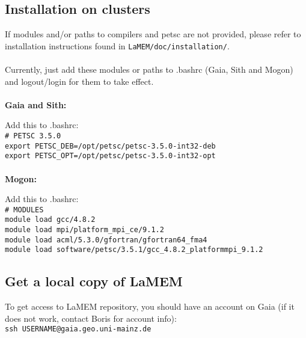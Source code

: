 \documentclass[a4paper,11pt]{article}
\begin{document}
\subsection{Installation on clusters}

If modules and/or paths to compilers and petsc are not provided, please refer to installation instructions found in \texttt{LaMEM/doc/installation/}.\\
\\
Currently, just add these modules or paths to .bashrc (Gaia, Sith and Mogon) and logout/login for them to take effect.\\
\\
\textbf{Gaia and Sith:}

Add this to .bashrc:\\
\indent \texttt{\# PETSC 3.5.0}\\
\indent \texttt{export PETSC\_DEB=/opt/petsc/petsc-3.5.0-int32-deb}\\
\indent \texttt{export PETSC\_OPT=/opt/petsc/petsc-3.5.0-int32-opt}\\
\\
\textbf{Mogon:}

Add this to .bashrc:\\
\indent \texttt{\# MODULES}\\
\indent \texttt{module load gcc/4.8.2}\\ 
\indent \texttt{module load mpi/platform\_mpi\_ce/9.1.2}\\ 
\indent \texttt{module load acml/5.3.0/gfortran/gfortran64\_fma4 }\\
\indent \texttt{module load software/petsc/3.5.1/gcc\_4.8.2\_platformmpi\_9.1.2}

\subsection{Get a local copy of LaMEM}

To get access to LaMEM repository, you should have an account on Gaia (if it does not work, contact Boris for account info):\\

\indent \texttt{ssh USERNAME@gaia.geo.uni-mainz.de}
\end{document}
